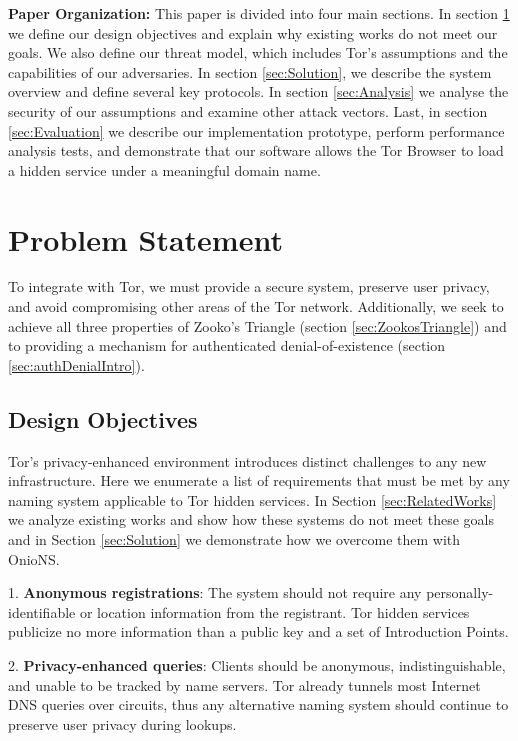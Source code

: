 \documentclass[USenglish,oneside,twocolumn]{article}
\begin{document}
\textbf{Paper Organization:} This paper is divided into four main sections. In section \ref{sec:problemStatement} we define our design objectives and explain why existing works do not meet our goals. We also define our threat model, which includes Tor's assumptions and the capabilities of our adversaries. In section \ref{sec:Solution}, we describe the system overview and define several key protocols. In section \ref{sec:Analysis} we analyse the security of our assumptions and examine other attack vectors. Last, in section \ref{sec:Evaluation} we describe our implementation prototype, perform performance analysis tests, and demonstrate that our software allows the Tor Browser to load a hidden service under a meaningful domain name.

\section{Problem Statement}
\label{sec:problemStatement}

To integrate with Tor, we must provide a secure system, preserve user privacy, and avoid compromising other areas of the Tor network. Additionally, we seek to achieve all three properties of Zooko's Triangle (section \ref{sec:ZookosTriangle}) and to providing a mechanism for authenticated denial-of-existence (section \ref{sec:authDenialIntro}).

\subsection{Design Objectives}

Tor's privacy-enhanced environment introduces distinct challenges to any new infrastructure. Here we enumerate a list of requirements that must be met by any naming system applicable to Tor hidden services. In Section \ref{sec:RelatedWorks} we analyze existing works and show how these systems do not meet these goals and in Section \ref{sec:Solution} we demonstrate how we overcome them with OnioNS.

1. \textbf{Anonymous registrations}: The system should not require any personally-identifiable or location information from the registrant. Tor hidden services publicize no more information than a public key and a set of Introduction Points.

2. \textbf{Privacy-enhanced queries}: Clients should be anonymous, indistinguishable, and unable to be tracked by name servers. Tor already tunnels most Internet DNS queries over circuits, thus any alternative naming system should continue to preserve user privacy during lookups.
\end{document}
